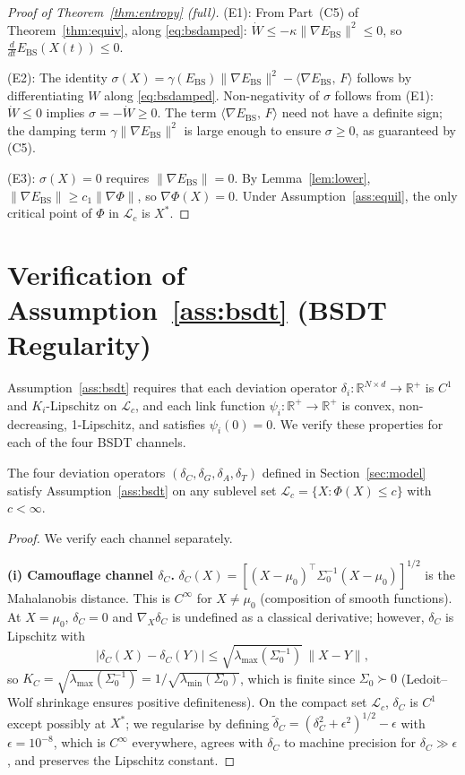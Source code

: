 \documentclass[final]{siamltex}
\newcommand{\R}{\mathbb{R}}
\newcommand{\norm}[1]{\lVert #1 \rVert}
\newcommand{\inner}[2]{\langle #1,\, #2 \rangle}
\providecommand{\grad}{\nabla}
\newcommand{\Ebs}{E_{\mathrm{BS}}}
\newcommand{\Xst}{X^*}
\newcommand{\ddt}{\tfrac{d}{dt}}
\begin{document}
\begin{appendix}
\begin{proof}[Proof of Theorem~\ref{thm:entropy} (full)]
(E1): From Part~(C5) of Theorem~\ref{thm:equiv}, along
\eqref{eq:bsdamped}:
$\dot{W} \le -\kappa\norm{\grad\Ebs}^2 \le 0$,
so $\ddt\Ebs(X(t)) \le 0$.

(E2): The identity
$\sigma(X) = \gamma(\Ebs)\norm{\grad\Ebs}^2 - \inner{\grad\Ebs}{F}$
follows by differentiating $W$ along \eqref{eq:bsdamped}.
Non-negativity of $\sigma$ follows from (E1):
$\dot{W} \le 0$ implies
$\sigma = -\dot{W} \ge 0$.
The term $\inner{\grad\Ebs}{F}$ need not have a definite sign;
the damping term $\gamma\norm{\grad\Ebs}^2$ is large enough to
ensure $\sigma \ge 0$, as guaranteed by (C5).

(E3): $\sigma(X)=0$ requires $\norm{\grad\Ebs}=0$.
By Lemma~\ref{lem:lower}, $\norm{\grad\Ebs} \ge c_1\norm{\grad\Phi}$,
so $\grad\Phi(X)=0$. Under Assumption~\ref{ass:equil}, the only
critical point of $\Phi$ in $\mathcal{L}_c$ is $\Xst$.
\end{proof}

\section{Verification of Assumption~\ref{ass:bsdt} (BSDT
Regularity)}\label{app:bsdt_proof}

Assumption~\ref{ass:bsdt} requires that each deviation operator
$\delta_i : \R^{N\times d}\to\R^+$ is $C^1$ and $K_i$-Lipschitz on
$\mathcal{L}_c$, and each link function $\psi_i : \R^+\to\R^+$ is
convex, non-decreasing, 1-Lipschitz, and satisfies $\psi_i(0)=0$.
We verify these properties for each of the four BSDT channels.

\begin{proposition}
\label{prop:bsdt_verify}
The four deviation operators $(\delta_C, \delta_G, \delta_A,
\delta_T)$ defined in Section~\ref{sec:model} satisfy
Assumption~\ref{ass:bsdt} on any sublevel set
$\mathcal{L}_c = \{X : \Phi(X) \le c\}$ with $c < \infty$.
\end{proposition}

\begin{proof}
We verify each channel separately.

\medskip
\noindent\textbf{(i) Camouflage channel $\delta_C$.}
$\delta_C(X) = [(X{-}\mu_0)^\top\Sigma_0^{-1}(X{-}\mu_0)]^{1/2}$
is the Mahalanobis distance.  This is $C^\infty$ for
$X \neq \mu_0$ (composition of smooth functions).
At $X = \mu_0$, $\delta_C = 0$ and $\grad_X\delta_C$ is undefined
as a classical derivative; however, $\delta_C$ is Lipschitz with
\[
  |\delta_C(X) - \delta_C(Y)| \le
  \sqrt{\lambda_{\max}(\Sigma_0^{-1})}\,\norm{X - Y},
\]
so $K_C = \sqrt{\lambda_{\max}(\Sigma_0^{-1})}
= 1/\sqrt{\lambda_{\min}(\Sigma_0)}$, which is finite since
$\Sigma_0 \succ 0$ (Ledoit--Wolf shrinkage ensures positive
definiteness).  On the compact set $\mathcal{L}_c$, $\delta_C$ is
$C^1$ except possibly at $\Xst$; we regularise by defining
$\tilde{\delta}_C = (\delta_C^2 + \epsilon^2)^{1/2} - \epsilon$
with $\epsilon = 10^{-8}$, which is $C^\infty$ everywhere,
agrees with $\delta_C$ to machine precision for
$\delta_C \gg \epsilon$, and preserves the Lipschitz constant.


\end{proof}
\end{appendix}
\end{document}
